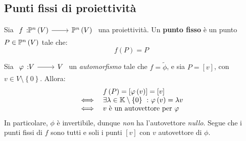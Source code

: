 \subsection{Punti fissi di proiettività}
\begin{define}
	Sia $\funz{f}{\proj{V}}{\proj{V}}$ una proiettività. Un \textbf{punto fisso} è un punto $P\in\proj{V}$ tale che:
	\begin{equation}
		f\left(P\right)=P
	\end{equation}
\vspace{-6mm}
\end{define}
Sia $\funz{\phi}{V}{V}$ un \textit{automorfismo} tale che $f=\widetilde{\phi}$, e sia $P=\left[v\right]$, con $v\in V\setminus\left\{0\right\}$. Allora:
\begin{equation*}
	\begin{array}{ll}
		& f\left(P\right)=\left[\phi\left(v\right)\right]=\left[v\right]\\
		\iff & \exists\lambda\in\kamp\setminus\left\{0\right\}\ \colon \phi\left(v\right)=\lambda v\\
		\iff & v\text{ è un autovettore per }\phi
	\end{array}
\end{equation*}
In particolare, $\phi$ è invertibile, dunque \textit{non} ha l'autovettore \textit{nullo}. Segue che i punti fissi di $f$ sono tutti e soli i punti $\left[v\right]$ con $v$ autovettore di $\phi$.
